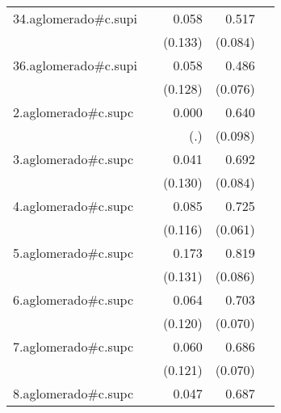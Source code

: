 {\begin{longtable}{l*{4}{D{.}{.}{-1}}}
\addlinespace
34.aglomerado#c.supi&                     &       0.058         &       0.517\sym{***}&                     \\
            &                     &     (0.133)         &     (0.084)         &                     \\
\addlinespace
36.aglomerado#c.supi&                     &       0.058         &       0.486\sym{***}&                     \\
            &                     &     (0.128)         &     (0.076)         &                     \\
\addlinespace
2.aglomerado#c.supc&                     &       0.000         &       0.640\sym{***}&                     \\
            &                     &         (.)         &     (0.098)         &                     \\
\addlinespace
3.aglomerado#c.supc&                     &       0.041         &       0.692\sym{***}&                     \\
            &                     &     (0.130)         &     (0.084)         &                     \\
\addlinespace
4.aglomerado#c.supc&                     &       0.085         &       0.725\sym{***}&                     \\
            &                     &     (0.116)         &     (0.061)         &                     \\
\addlinespace
5.aglomerado#c.supc&                     &       0.173         &       0.819\sym{***}&                     \\
            &                     &     (0.131)         &     (0.086)         &                     \\
\addlinespace
6.aglomerado#c.supc&                     &       0.064         &       0.703\sym{***}&                     \\
            &                     &     (0.120)         &     (0.070)         &                     \\
\addlinespace
7.aglomerado#c.supc&                     &       0.060         &       0.686\sym{***}&                     \\
            &                     &     (0.121)         &     (0.070)         &                     \\
\addlinespace
8.aglomerado#c.supc&                     &       0.047         &       0.687\sym{***}&                     \\

\end{longtable}}
